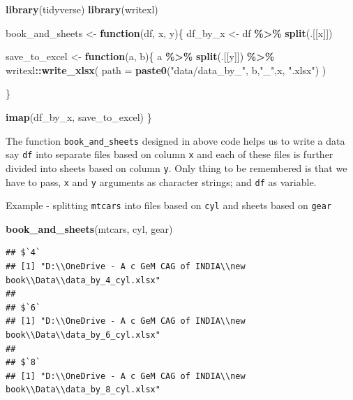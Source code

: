 \documentclass[
]{book}
\newenvironment{Shaded}{\begin{snugshade}}{\end{snugshade}}
\newcommand{\AttributeTok}[1]{\textcolor[rgb]{0.13,0.29,0.53}{#1}}
\newcommand{\ControlFlowTok}[1]{\textcolor[rgb]{0.13,0.29,0.53}{\textbf{#1}}}
\newcommand{\FunctionTok}[1]{\textcolor[rgb]{0.13,0.29,0.53}{\textbf{#1}}}
\newcommand{\NormalTok}[1]{#1}
\newcommand{\OtherTok}[1]{\textcolor[rgb]{0.56,0.35,0.01}{#1}}
\newcommand{\SpecialCharTok}[1]{\textcolor[rgb]{0.81,0.36,0.00}{\textbf{#1}}}
\newcommand{\StringTok}[1]{\textcolor[rgb]{0.31,0.60,0.02}{#1}}
\begin{document}
\begin{Shaded}
\begin{Highlighting}[]
\FunctionTok{library}\NormalTok{(tidyverse)}
\FunctionTok{library}\NormalTok{(writexl)}

\NormalTok{book\_and\_sheets }\OtherTok{\textless{}{-}} \ControlFlowTok{function}\NormalTok{(df, x, y)\{}
\NormalTok{  df\_by\_x }\OtherTok{\textless{}{-}}\NormalTok{ df }\SpecialCharTok{\%\textgreater{}\%} 
    \FunctionTok{split}\NormalTok{(.[[x]])}
  
\NormalTok{  save\_to\_excel }\OtherTok{\textless{}{-}} \ControlFlowTok{function}\NormalTok{(a, b)\{}
\NormalTok{    a }\SpecialCharTok{\%\textgreater{}\%} 
      \FunctionTok{split}\NormalTok{(.[[y]]) }\SpecialCharTok{\%\textgreater{}\%} 
\NormalTok{      writexl}\SpecialCharTok{::}\FunctionTok{write\_xlsx}\NormalTok{(}
        \AttributeTok{path =} \FunctionTok{paste0}\NormalTok{(}\StringTok{"data/data\_by\_"}\NormalTok{, b,}\StringTok{"\_"}\NormalTok{,x, }\StringTok{".xlsx"}\NormalTok{)}
\NormalTok{      )}
    
\NormalTok{  \}}
  
  \FunctionTok{imap}\NormalTok{(df\_by\_x, save\_to\_excel)}
\NormalTok{\}}
\end{Highlighting}
\end{Shaded}

The function \texttt{book\_and\_sheets} designed in above code helps us to write a data say \texttt{df} into separate files based on column \texttt{x} and each of these files is further divided into sheets based on column \texttt{y}. Only thing to be remembered is that we have to pass, \texttt{x} and \texttt{y} arguments as character strings; and \texttt{df} as variable.

Example - splitting \texttt{mtcars} into files based on \texttt{cyl} and sheets based on \texttt{gear}

\begin{Shaded}
\begin{Highlighting}[]
\FunctionTok{book\_and\_sheets}\NormalTok{(mtcars, }\StringTok{\textquotesingle{}cyl\textquotesingle{}}\NormalTok{, }\StringTok{\textquotesingle{}gear\textquotesingle{}}\NormalTok{)}
\end{Highlighting}
\end{Shaded}

\begin{verbatim}
## $`4`
## [1] "D:\\OneDrive - A c GeM CAG of INDIA\\new book\\Data\\data_by_4_cyl.xlsx"
## 
## $`6`
## [1] "D:\\OneDrive - A c GeM CAG of INDIA\\new book\\Data\\data_by_6_cyl.xlsx"
## 
## $`8`
## [1] "D:\\OneDrive - A c GeM CAG of INDIA\\new book\\Data\\data_by_8_cyl.xlsx"
\end{verbatim}
\end{document}
